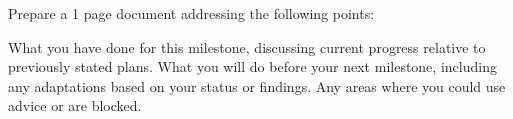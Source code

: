 \documentclass{article}
\begin{document}
Prepare a 1 page document addressing the following points:

What you have done for this milestone, discussing current progress relative to previously stated plans.
What you will do before your next milestone, including any adaptations based on your status or findings.
Any areas where you could use advice or are blocked.
\end{document}
